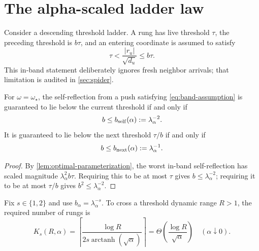 \section{The alpha-scaled ladder law}
\label{sec:ladder}

Consider a descending threshold ladder.  A rung has live threshold $\tau$,
the preceding threshold is $b\tau$, and an entering coordinate is assumed to
satisfy
\begin{equation}
 \tau<\frac{|r_u|}{\sqrt{d_u}}\leq b\tau.
 \label{eq:band-assumption}
\end{equation}
This in-band statement deliberately ignores fresh neighbor arrivals; that
limitation is audited in \cref{sec:spider}.

\begin{proposition}
\label{prop:admissible-bases}
For $\omega=\omega_\star$, the self-reflection from a push satisfying
\cref{eq:band-assumption} is guaranteed to lie below the current threshold if
and only if
\begin{equation}
 b\leq b_{\rm self}(\alpha):=\lambda_\alpha^{-2}.
 \label{eq:self-base}
\end{equation}
It is guaranteed to lie below the next threshold $\tau/b$ if and only if
\begin{equation}
 b\leq b_{\rm next}(\alpha):=\lambda_\alpha^{-1}.
 \label{eq:next-base}
\end{equation}
\end{proposition}

\begin{proof}
By \cref{lem:optimal-parameterization}, the worst in-band self-reflection has
scaled magnitude $\lambda_\alpha^2b\tau$.  Requiring this to be at most
$\tau$ gives $b\leq\lambda_\alpha^{-2}$; requiring it to be at most
$\tau/b$ gives $b^2\leq\lambda_\alpha^{-2}$.
\end{proof}

\begin{corollary}
\label{cor:rung-count}
Fix $s\in\{1,2\}$ and use $b_\alpha=\lambda_\alpha^{-s}$.  To cross a
threshold dynamic range $R>1$, the required number of rungs is
\begin{equation}
 K_s(R,\alpha)
 =\left\lceil
   \frac{\log R}
        {2s\operatorname{arctanh}(\sqrt\alpha)}
  \right\rceil
 =\Theta\!\left(\frac{\log R}{\sqrt\alpha}\right)
 \quad(\alpha\downarrow0).
 \label{eq:rung-count}
\end{equation}
\end{corollary}

